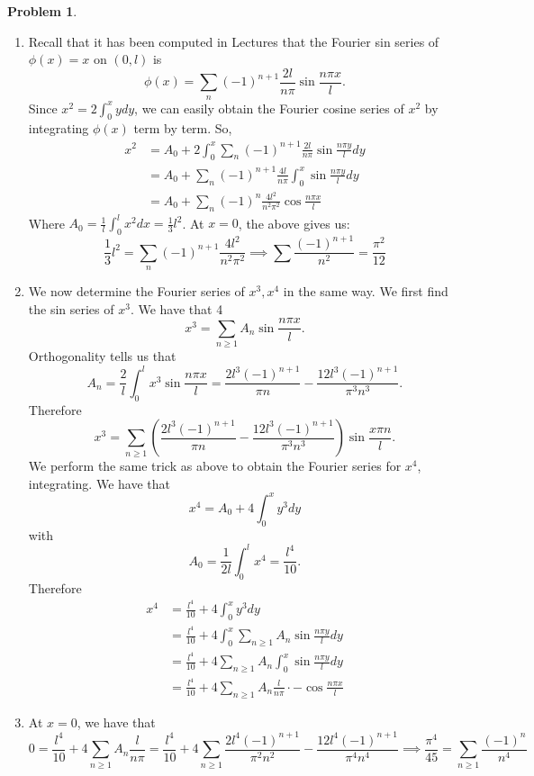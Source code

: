 \documentclass[12pt, a4paper]{article}
\newtheorem{problem}{Problem}
\theoremstyle{definition}
\newcommand{\penum}{ \begin{enumerate}[label=\bf(\alph*), leftmargin=0pt]}
\newcommand{\epenum}{ \end{enumerate} }
\begin{document}
	\newpage
	\begin{problem}
	\end{problem}
	\penum
	\item Recall that it has been computed in Lectures that the Fourier sin series of $\phi(x) = x$ on $(0,l)$ is
	$$\phi(x) = \sum_n (-1)^{n+1}\frac{ 2l}{n\pi} \sin \frac{n\pi x}{l}.$$
	Since $x^2 = 2 \int_0^x y dy$, we can easily obtain the Fourier cosine series of $x^2$ by integrating $\phi(x)$ term by term.
	So,
	\begin{align*}
		x^2 &= A_0+ 2 \int_0^x\sum_n (-1)^{n+1}\frac{ 2l}{n\pi} \sin \frac{n\pi y}{l} dy
		\\ & = A_0 + \sum_n (-1)^{n+1} \frac{4l}{n\pi} \int_0^x \sin \frac{n\pi y}{l} dy
		\\ & =  A_0 +  \sum_n (-1)^{n} \frac{4l^2}{n^2\pi^2} \cos\frac{n\pi x}{l}
	\end{align*}
	Where $A_0 = \frac{1}{l} \int_0^l x^2 dx  = \frac{1}{3}l^2$. At $x=0$, the above gives us:
	$$\frac{1}{3}l^2 = \sum_n (-1)^{n+1}\frac{4l^2}{n^2\pi^2} \implies \sum \frac{(-1)^{n+1}}{n^2} =\frac{\pi^2}{12} $$
	\item We now determine the Fourier series of $x^3,x^4$ in the same way. We first find the sin series of $x^3$. We have that 4
	$$x^3 = \sum_{n\geq 1} A_n \sin \frac{n\pi x}{l}.$$
	Orthogonality tells us that
	$$A_n = \frac{2}{l} \int_0^l  x^3 \sin\frac{n\pi x}{l} = \frac{2l^3 (-1)^{n+1}}{\pi n} - \frac{12l^3(-1)^{n+1}}{\pi^3 n^3}.$$
	Therefore $$x^3 = \sum_{n\geq 1}\left(\frac{2l^3 (-1)^{n+1}}{\pi n} - \frac{12l^3(-1)^{n+1}}{\pi^3 n^3} \right) \sin \frac{x\pi n}{l}.$$
	We perform the same trick as above to obtain the Fourier series for $x^4$, integrating. We have that $$x^4 = A_0+ 4\int_0^x y^3 dy$$ with $$A_0= \frac{1}{2l} \int_0^l x^4 =  \frac{l^4}{10}.$$
	Therefore
	\begin{align*}
		x^4 &= \frac{l^4}{10} + 4\int_0^x y^3 dy
		\\ & = \frac{l^4}{10} +4 \int_0^x \sum_{n\geq 1} A_n \sin \frac{n\pi y}{l} dy
		\\ & = \frac{l^4}{10} + 4\sum_{n\geq 1} A_n \int_{0}^x \sin \frac{n\pi y}{l} dy
		\\ & = \frac{l^4}{10} +4 \sum_{n\geq 1} A_n \frac{l}{n \pi} \cdot -\cos \frac{n\pi x}{l}
	\end{align*}
	\item At $x = 0$, we have that
	$$0 = \frac{l^4}{10} +4 \sum_{n\geq 1} A_n \frac{l}{n \pi} = \frac{l^4}{10} + 4\sum_{n \geq 1}\frac{2l^4 (-1)^{n+1}}{\pi^2 n^2} - \frac{12l^4(-1)^{n+1}}{\pi^4 n^4} \implies \frac{\pi^4}{45} = \sum_{n\geq 1}\frac{(-1)^n}{n^4}$$
	\epenum
\end{document}
